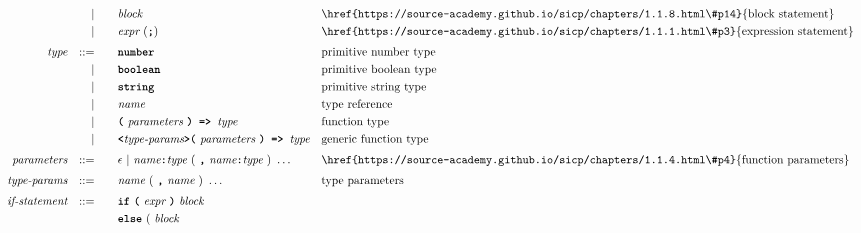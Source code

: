 \begin{alignat*}{9}
&&                       && |   &\quad &&  \textit{block} 
                                                           && \textrm{\href{https://source-academy.github.io/sicp/chapters/1.1.8.html\#p14}{block statement}}\\
&&                       && |   &\quad &&  \textit{expr} \ (\textbf{\texttt{;}})
                                                           && \textrm{\href{https://source-academy.github.io/sicp/chapters/1.1.1.html\#p3}{expression statement}} \\[1mm]
&& \textit{type}         && ::= & && \code{number} && \textrm{primitive number type} \\
&&                       && |   &\quad && \code{boolean} && \textrm{primitive boolean type} \\ 
&&                       && |   &\quad && \code{string} && \textrm{primitive string type} \\ 
&&                       && |   &\quad && \textit{name} && \textrm{type reference} \\
&&                       && |   &\quad && \code{(}\ \textit{parameters}\ \code{) => } \textit{type} 
                                            && \textrm{function type} \\
&&                       && |   &\quad && \code{<} \textit{type-params} \code{>(}\ 
                                            \textit{parameters}\ \code{) => } \textit{type} 
                                            && \textrm{generic function type} \\[1mm]
&& \textit{parameters}   && ::= &\quad &&  \epsilon\ | \  \textit{name} \code{:} \textit{type} \ 
                                                   (\ \textbf{\texttt{,}} \ \textit{name}\code{:} \textit{type}\ )\ \ldots
                                                            && \textrm{\href{https://source-academy.github.io/sicp/chapters/1.1.4.html\#p4}{function parameters}}   \\[1mm]
&& \textit{type-params}   && ::= &\quad &&  \textit{name} \ (\ \code{,} \ \textit{name}\ )\ \ldots
                                                && \textrm{type parameters}   \\[1mm]
&& \textit{if-statement} && ::= &\quad &&  \textbf{\texttt{if}}\
                                   \textbf{\texttt{(}}\ \textit{expr} \ \textbf{\texttt{)}}\ 
                                   \textit{block} \\
&&                       &&     &      && \textbf{\texttt{else}}\
                                          (\ \textit{block}

\end{alignat*}
